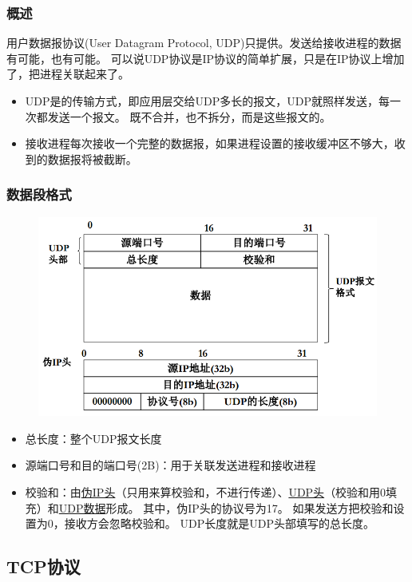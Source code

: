\subsubsection{概述}
用户数据报协议(User Datagram Protocol, UDP)只提供。发送给接收进程的数据有可能，也有可能。
可以说UDP协议是IP协议的简单扩展，只是在IP协议上增加了，把进程关联起来了。
\begin{itemize}
\item UDP是的传输方式，即应用层交给UDP多长的报文，UDP就照样发送，每一次都发送一个报文。
既不合并，也不拆分，而是这些报文的。
\item 接收进程每次接收一个完整的数据报，如果进程设置的接收缓冲区不够大，收到的数据报将被截断。
\end{itemize}

\subsubsection{数据段格式}
\begin{figure}[H]
    \centering
    \includegraphics[width=0.6\linewidth]{fig/udp_format.png}
\end{figure}
\begin{itemize}
    \item 总长度：整个UDP报文长度
    \item 源端口号和目的端口号(2B)：用于关联发送进程和接收进程
    \item 校验和：由\underline{伪IP头}（只用来算校验和，不进行传递）、\underline{UDP头}（校验和用0填充）和\underline{UDP数据}形成。
    其中，伪IP头的协议号为17。
    如果发送方把校验和设置为0，接收方会忽略校验和。
    UDP长度就是UDP头部填写的总长度。
\end{itemize}

\subsection{TCP协议}
